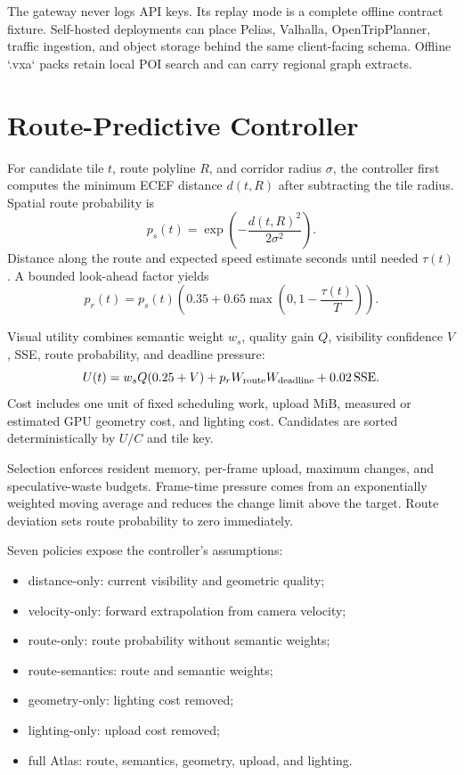 \documentclass[12pt]{article}
\begin{document}
The gateway never logs API keys. Its replay mode is a complete offline contract fixture. Self-hosted
deployments can place Pelias, Valhalla, OpenTripPlanner, traffic ingestion, and object storage
behind the same client-facing schema. Offline `.vxa` packs retain local POI search and can carry
regional graph extracts.

\section{Route-Predictive Controller}
For candidate tile $t$, route polyline $R$, and corridor radius $\sigma$, the controller first
computes the minimum ECEF distance $d(t,R)$ after subtracting the tile radius. Spatial route
probability is
\[
p_s(t)=\exp\left(-\frac{d(t,R)^2}{2\sigma^2}\right).
\]
Distance along the route and expected speed estimate seconds until needed $\tau(t)$. A bounded
look-ahead factor yields
\[
p_r(t)=p_s(t)\left(0.35+0.65\max\left(0,1-\frac{\tau(t)}{T}\right)\right).
\]

Visual utility combines semantic weight $w_s$, quality gain $Q$, visibility confidence $V$, SSE,
route probability, and deadline pressure:
\[
U(t)=w_sQ(0.25+V)+p_rW_{\rm route}W_{\rm deadline}
      +0.02\,\mathrm{SSE}.
\]
Cost includes one unit of fixed scheduling work, upload MiB, measured or estimated GPU geometry
cost, and lighting cost. Candidates are sorted deterministically by $U/C$ and tile key.

Selection enforces resident memory, per-frame upload, maximum changes, and speculative-waste
budgets. Frame-time pressure comes from an exponentially weighted moving average and reduces the
change limit above the target. Route deviation sets route probability to zero immediately.

Seven policies expose the controller's assumptions:
\begin{itemize}
\item distance-only: current visibility and geometric quality;
\item velocity-only: forward extrapolation from camera velocity;
\item route-only: route probability without semantic weights;
\item route-semantics: route and semantic weights;
\item geometry-only: lighting cost removed;
\item lighting-only: upload cost removed;
\item full Atlas: route, semantics, geometry, upload, and lighting.
\end{itemize}
\end{document}
